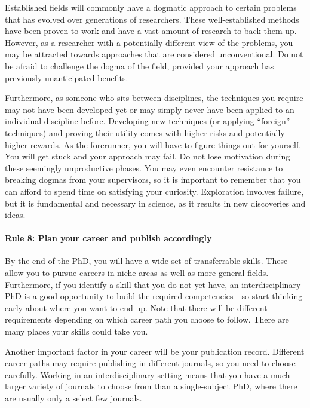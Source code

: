 \documentclass[12pt]{report}
\begin{document}
Established fields will commonly have a dogmatic approach to certain problems that has evolved over generations of researchers. These well-established methods have been proven to work and have a vast amount of research to back them up. However, as a researcher with a potentially different view of the problems, you may be attracted towards approaches that are considered unconventional. Do not be afraid to challenge the dogma of the field, provided your approach has previously unanticipated benefits.

Furthermore, as someone who sits between disciplines, the techniques you require may not have been developed yet or may simply never have been applied to an individual discipline before. Developing new techniques (or applying “foreign” techniques) and proving their utility comes with higher risks and potentially higher rewards. As the forerunner, you will have to figure things out for yourself. You will get stuck and your approach may fail. Do not lose motivation during these seemingly unproductive phases. You may even encounter resistance to breaking dogmas from your supervisors, so it is important to remember that you can afford to spend time on satisfying your curiosity. Exploration involves failure, but it is fundamental and necessary in science, as it results in new discoveries and ideas.

\paragraph{Rule 8: Plan your career and publish accordingly}

By the end of the PhD, you will have a wide set of transferrable skills. These allow you to pursue careers in niche areas as well as more general fields. Furthermore, if you identify a skill that you do not yet have, an interdisciplinary PhD is a good opportunity to build the required competencies—so start thinking early about where you want to end up. Note that there will be different requirements depending on which career path you choose to follow. There are many places your skills could take you.

Another important factor in your career will be your publication record. Different career paths may require publishing in different journals, so you need to choose carefully. Working in an interdisciplinary setting means that you have a much larger variety of journals to choose from than a single-subject PhD, where there are usually only a select few journals.
\end{document}
